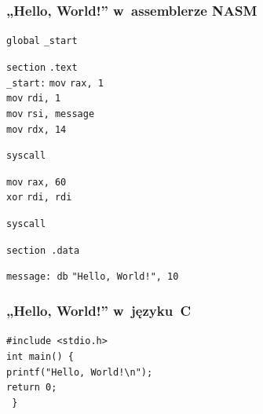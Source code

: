 \documentclass[10pt,t]{beamer}
\begin{document}
\begin{frame}
  \frametitle{„Hello, World!” w~assemblerze NASM
    \parencite{Toal-NASM-Tutorial-Ver-2024}}


  \hphantom{aaaaaaaaa} \texttt{global} \hphantom{aa} \texttt{\_start} \\
  \vspace{0.8em}

  \hphantom{aaaaaaaaa} \texttt{section} \hphantom{a} \texttt{.text} \\
  \texttt{\_start:} \hphantom{a} \texttt{mov} \hphantom{aaaaaa}
  \texttt{rax, 1} \\
  \hphantom{aaaaaaaaa} \texttt{mov} \hphantom{aaaaaa} \texttt{rdi, 1} \\
  \hphantom{aaaaaaaaa} \texttt{mov} \hphantom{aaaaaa}
  \texttt{rsi, message} \\
  \hphantom{aaaaaaaaa} \texttt{mov} \hphantom{aaaaaa} \texttt{rdx, 14} \\
  \vspace{0.8em}

  \hphantom{aaaaaaaaa} \texttt{syscall} \\
  \vspace{0.8em}

  \hphantom{aaaaaaaaa} \texttt{mov} \hphantom{aaaaaa} \texttt{rax, 60} \\
  \hphantom{aaaaaaaaa} \texttt{xor} \hphantom{aaaaaa} \texttt{rdi, rdi} \\
  \vspace{0.8em}

  \hphantom{aaaaaaaaa} \texttt{syscall} \\
  \vspace{0.8em}

  \hphantom{aaaaaaaaa} \texttt{section .data} \\
  \vspace{0.8em}

  \texttt{message: db} \hphantom{aaaaa} \texttt{"Hello, World!", 10}

\end{frame}





\begin{frame}
  \frametitle{„Hello, World!” w~języku~C}


  \texttt{\#include <stdio.h>} \\
  \vspace{0.8em}
  \texttt{int main() \{ } \\
  \hphantom{aaaa} \texttt{printf("Hello, World!\textbackslash n");} \\
  \vspace{0.8em}
  \vspace{0.8em}
  \vspace{0.8em}
  \vspace{0.8em}
  \hphantom{aaaa} \texttt{return 0;} \\
  \texttt{ \} }

\end{frame}
\end{document}
